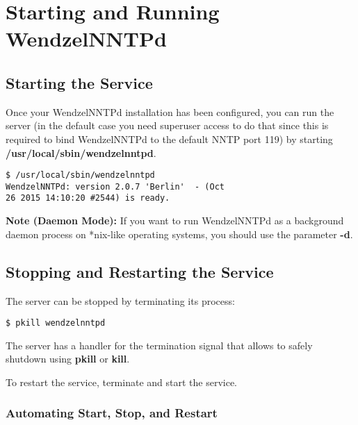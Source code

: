 \documentclass[12pt,fleqn,leqno]{scrbook}
\begin{document}
\hypertarget{starting-and-running-wendzelnntpd-1}{%
\section{Starting and Running
WendzelNNTPd}\label{starting-and-running-wendzelnntpd-1}}

\hypertarget{starting-the-service-1}{%
\subsection{Starting the Service}\label{starting-the-service-1}}

Once your WendzelNNTPd installation has been configured, you can run the
server (in the default case you need superuser access to do that since
this is required to bind WendzelNNTPd to the default NNTP port 119) by
starting \textbf{/usr/local/sbin/wendzelnntpd}.

\begin{verbatim}
$ /usr/local/sbin/wendzelnntpd 
WendzelNNTPd: version 2.0.7 'Berlin'  - (Oct
26 2015 14:10:20 #2544) is ready.
\end{verbatim}

\textbf{Note (Daemon Mode):} If you want to run WendzelNNTPd as a
background daemon process on *nix-like operating systems, you should use
the parameter \textbf{-d}.

\hypertarget{stopping-and-restarting-the-service-1}{%
\subsection{Stopping and Restarting the
Service}\label{stopping-and-restarting-the-service-1}}

The server can be stopped by terminating its process:

\begin{verbatim}
$ pkill wendzelnntpd
\end{verbatim}

The server has a handler for the termination signal that allows to
safely shutdown using \textbf{pkill} or \textbf{kill}.

To restart the service, terminate and start the service.

\hypertarget{automating-start-stop-and-restart-1}{%
\subsubsection{Automating Start, Stop, and
Restart}\label{automating-start-stop-and-restart-1}}
\end{document}
